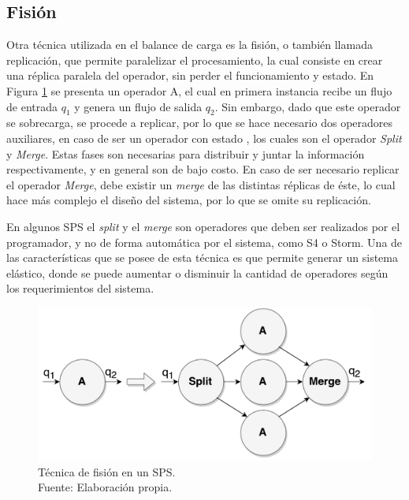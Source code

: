 \subsection{Fisión}
\label{sec:fisionBC}


Otra técnica utilizada en el balance de carga es la fisión, o también llamada replicación, que permite paralelizar el procesamiento, la cual consiste en crear una réplica paralela del operador, sin perder el funcionamiento y estado. En Figura \ref{fig:fision} se presenta un operador A, el cual en primera instancia recibe un flujo de entrada $q_1$ y genera un flujo de salida $q_2$. Sin embargo, dado que este operador se sobrecarga, se procede a replicar, por lo que se hace necesario dos operadores auxiliares, \normalsize{en caso de ser un operador con estado} \citep{WuKWO12}, los cuales son el operador \textit{Split} y \textit{Merge}. Estas fases son necesarias para distribuir y juntar la información respectivamente, y en general son de bajo costo. En caso de ser necesario replicar el operador \textit{Merge}, debe existir un \textit{merge} de las distintas réplicas de éste, lo cual hace más complejo el diseño del sistema, por lo que se omite su replicación.

En algunos SPS el \textit{split} y el \textit{merge} son operadores que deben ser realizados por el programador, y no de forma automática por el sistema, como S4 o Storm. Una de las características que se posee de esta técnica es que permite generar un sistema elástico, donde se puede aumentar o disminuir la cantidad de operadores según los requerimientos del sistema.

\begin{figure}[!ht]
	\centering
	\includegraphics[scale=0.4]{images/Fision.pdf}
	\caption[Técnica de fisión en un SPS.]{Técnica de fisión en un SPS.\\Fuente: Elaboración propia.}
	\label{fig:fision}
\end{figure}


